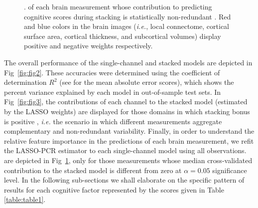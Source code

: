 \documentclass[10pt,letterpaper]{article}
\begin{document}
\begin{figure}[!ht]
    \centering
    \caption{{\bf {}}.   of each brain measurement whose contribution to predicting cognitive scores during stacking is statistically non-redundant . Red and blue colors in the brain images ({\it i.e.}, local connectome, cortical surface area, cortical thickness, and subcortical volumes) display positive and negative weights respectively. }
    \label{fig:fig4}
\end{figure}

The overall performance of the single-channel and stacked models are depicted in Fig~\ref{fig:fig2}. These accuracies were determined using the coefficient of determination $R^2$ (see  for the mean absolute error scores), which shows the percent variance explained by each model in out-of-sample test sets. In Fig~\ref{fig:fig3}, the contributions of each channel to the stacked model (estimated by the LASSO weights) are displayed for those domains in which stacking bonus is positive , {\it i.e.} the scenario in which different measurements aggregate complementary and non-redundant variability. Finally, in order to understand the relative feature importance in the predictions of each brain measurement, we refit the LASSO-PCR estimator to each single-channel model using all observations.  are depicted in Fig~\ref{fig:fig4}, only for those measurements whose median cross-validated contribution to the stacked model is different from zero at $\alpha=0.05$ significance level. In the following sub-sections we shall elaborate on the specific pattern of results for each cognitive factor represented by the scores given in Table \ref{table:table1}.
\end{document}
